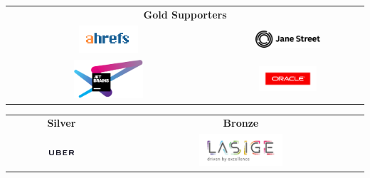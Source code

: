 \begin{center}
  \begin{tabular}{c@{~~~~~~}c}
   \multicolumn{2}{c}{{\huge\bf Gold Supporters}}\\[3ex]
    \includegraphics[width=0.3\textwidth]{img/logos/ahrefs-logo-for-conf.png} &
    \includegraphics[width=0.45\textwidth]{img/logos/jane-street.png} \\
    \includegraphics[width=0.35\textwidth]{img/logos/logo-variant-4.png} &
    \includegraphics[width=0.4\textwidth]{img/logos/oracle-sponsorship-clr.png} \\
  \end{tabular}
\end{center}

  \vspace*{.75in}

\begin{center}
  \begin{tabular}{c@{~~~~~}|@{~~~}c}
    {\huge\bf Silver} & {\huge\bf Bronze} \\[3ex]
    \includegraphics[width=0.25\textwidth]{img/logos/uber.png} &
    \includegraphics[width=0.35\textwidth]{img/logos/Lasige.jpg} \\
  \end{tabular}
\end{center}


\newpage
